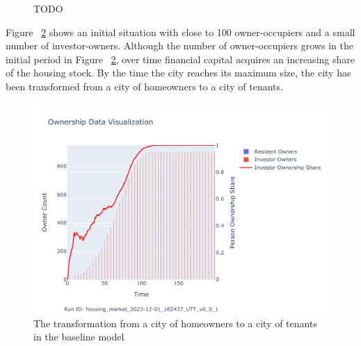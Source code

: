 \begin{figure}
\centering
{}
\caption{TODO}
\label{fig:enter-label}
\end{figure}

 Figure ~\ref{fig:Baseline_ownership_trajectory} shows an initial situation with close to 100 owner-occupiers and a small number of investor-owners. Although the number of owner-occupiers grows in the initial period in Figure ~\ref{fig:Baseline_ownership_trajectory}, over time financial capital acquires an increasing share of the housing stock. By the time the city reaches its maximum size, the city has been transformed from a city of homeowners to a city of tenants.


\begin{figure}
    \centering
    \includegraphics[scale=.8, trim={0 1cm 0 1.8cm},clip]{fig/Analysis/Ownership_Data_1.pdf}
    \caption{The transformation from a city of homeowners to a city of tenants in the baseline model}
    \label{fig:Baseline_ownership_trajectory}
\end{figure}

